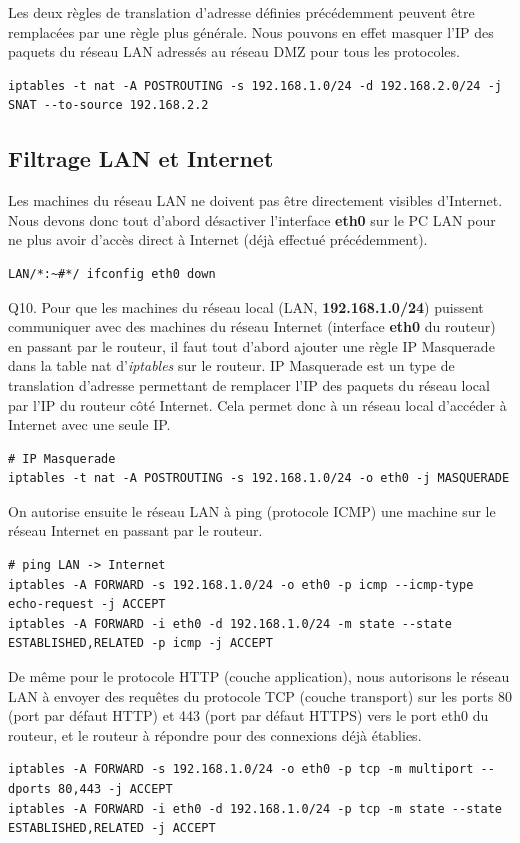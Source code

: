 \documentclass[frenchb, 11pt]{article}
\newlength{\leftbarwidth}
\newlength{\leftbarsep}
\newcommand*{\leftbarcolorcmd}{\color{leftbarcolor}} %
\renewenvironment{leftbar}{%
    \def\FrameCommand{{\leftbarcolorcmd{\vrule width \leftbarwidth\relax\hspace {\leftbarsep}}}}%
    \MakeFramed {\advance \hsize -\width \FrameRestore }%
}{%
    \endMakeFramed
}
\begin{document}
Les deux règles de translation d'adresse définies précédemment peuvent être remplacées par une règle plus générale. Nous pouvons en effet masquer l'IP des paquets du réseau LAN adressés au réseau DMZ pour tous les protocoles.
\begin{lstlisting}
iptables -t nat -A POSTROUTING -s 192.168.1.0/24 -d 192.168.2.0/24 -j SNAT --to-source 192.168.2.2
\end{lstlisting}

\subsection{Filtrage LAN et Internet}
Les machines du réseau LAN ne doivent pas être directement visibles d'Internet. Nous devons donc tout d'abord désactiver l'interface \textbf{eth0} sur le PC LAN pour ne plus avoir d'accès direct à Internet (déjà effectué précédemment).
\begin{lstlisting}
LAN/*:~#*/ ifconfig eth0 down
\end{lstlisting}

\begin{leftbar}
	\noindent Q10.
	Pour que les machines du réseau local (LAN, \textbf{192.168.1.0/24}) puissent communiquer avec des machines du réseau Internet (interface \textbf{eth0} du routeur) en passant par le routeur, il faut tout d'abord ajouter une règle IP Masquerade dans la table nat d'\emph{iptables} sur le routeur. IP Masquerade est un type de translation d'adresse permettant de remplacer l'IP des paquets du réseau local par l'IP du routeur côté Internet. Cela permet donc à un réseau local d'accéder à Internet avec une seule IP.
	\begin{lstlisting}[numbers=none]
# IP Masquerade
iptables -t nat -A POSTROUTING -s 192.168.1.0/24 -o eth0 -j MASQUERADE
	\end{lstlisting}
	On autorise ensuite le réseau LAN à ping (protocole ICMP) une machine sur le réseau Internet en passant par le routeur.
	\begin{lstlisting}[numbers=none]
# ping LAN -> Internet
iptables -A FORWARD -s 192.168.1.0/24 -o eth0 -p icmp --icmp-type echo-request -j ACCEPT
iptables -A FORWARD -i eth0 -d 192.168.1.0/24 -m state --state ESTABLISHED,RELATED -p icmp -j ACCEPT
	\end{lstlisting}
	De même pour le protocole HTTP (couche application), nous autorisons le réseau LAN à envoyer des requêtes du protocole TCP (couche transport) sur les ports 80 (port par défaut HTTP) et 443 (port par défaut HTTPS) vers le port eth0 du routeur, et le routeur à répondre pour des connexions déjà établies.
	\begin{lstlisting}[numbers=none]
iptables -A FORWARD -s 192.168.1.0/24 -o eth0 -p tcp -m multiport --dports 80,443 -j ACCEPT
iptables -A FORWARD -i eth0 -d 192.168.1.0/24 -p tcp -m state --state ESTABLISHED,RELATED -j ACCEPT
	\end{lstlisting}
\end{leftbar}
\end{document}
